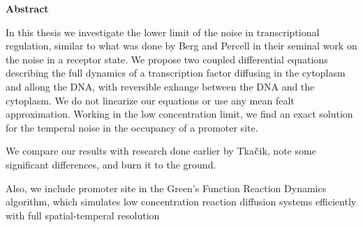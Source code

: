 \begin{center}
{\center \bf Abstract}
\end{center}

In this thesis we investigate the lower limit of the noise in transcriptional regulation, similar to what was done by Berg and Percell in their seminal work on the noise in a receptor state. We propose two coupled differential equations describing the full dynamics of a transcription factor diffusing in the cytoplasm and allong the DNA, with reversible  exhange between the DNA and the cytoplasm. We do not linearize our equations or use any mean fealt approximation. Working in the low concentration limit, we find an exact solution for the temperal noise in the occupancy of a promoter site. 

We compare our results with research done earlier by Tka$\check{\rm c}$ik, note some significant differences, and burn it to the ground.

Also, we include promoter site in the Green's Function Reaction Dynamics algorithm, which simulates low concentration reaction diffusion systems efficiently with full spatial-temperal resolution